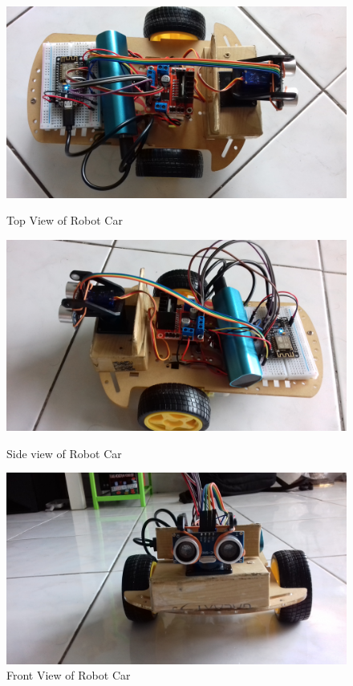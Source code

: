 \documentclass[sigconf]{acmart}
\begin{document}
\begin{figure}[htb]
	\includegraphics[width=1.0\columnwidth]{images/Top-view.jpg}
	\caption{Top View of Robot Car}\label{F:topview}

	\includegraphics[width=1.0\columnwidth]{images/Side-view2.jpg}
	\caption{Side view of Robot Car}\label{F:sideview}

	\includegraphics[width=1.0\columnwidth]{images/Front-view.jpg}
	\caption{Front View of Robot Car}\label{F:frontview}
\end{figure}
\end{document}
